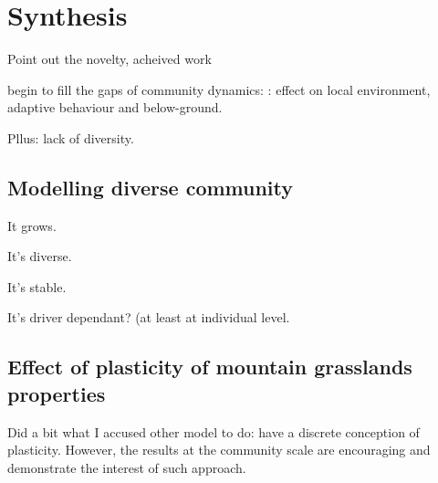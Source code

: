 

\chapter{Synthesis}

Point out the novelty, acheived work 

begin to fill the gaps of community dynamics: \parencite{berger_competition_2008}: effect on local environment, adaptive behaviour and below-ground.

Pllus: lack of diversity.

\section{Modelling diverse community}

It grows.

It's diverse.

It's stable.

It's driver dependant? (at least at individual level.


\section{Effect of plasticity of mountain grasslands properties}

Did a bit what I accused other model to do: have a discrete conception of plasticity. However, the results at the community scale are encouraging and demonstrate the interest of such approach.
%


